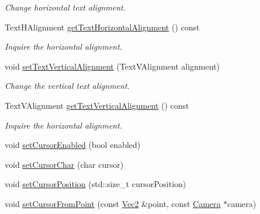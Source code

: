 \begin{DoxyCompactItemize}
\begin{DoxyCompactList}\small\item\em Change horizontal text alignment. \end{DoxyCompactList}\item 
Text\+H\+Alignment \hyperlink{classui_1_1TextField_acd343b03227c7cf58a325f34ba3e1d21}{get\+Text\+Horizontal\+Alignment} () const
\begin{DoxyCompactList}\small\item\em Inquire the horizontal alignment. \end{DoxyCompactList}\item 
void \hyperlink{classui_1_1TextField_a05d3b9f37bbffee99ec903ef59ebca56}{set\+Text\+Vertical\+Alignment} (Text\+V\+Alignment alignment)
\begin{DoxyCompactList}\small\item\em Change the vertical text alignment. \end{DoxyCompactList}\item 
Text\+V\+Alignment \hyperlink{classui_1_1TextField_a79228941a990932f6af8d07268f5a5e7}{get\+Text\+Vertical\+Alignment} () const
\begin{DoxyCompactList}\small\item\em Inquire the horizontal alignment. \end{DoxyCompactList}\item 
void \hyperlink{classui_1_1TextField_acfbd7a912c166c1de933081466976f15}{set\+Cursor\+Enabled} (bool enabled)
\item 
void \hyperlink{classui_1_1TextField_a27149c6499b7651ad4f1fca8211fda1e}{set\+Cursor\+Char} (char cursor)
\item 
void \hyperlink{classui_1_1TextField_a04e48a8fd94ac2015cdaafe73ca62c76}{set\+Cursor\+Position} (std\+::size\+\_\+t cursor\+Position)
\item 
void \hyperlink{classui_1_1TextField_a130ef17d3dda676d98b28e46f1d1f253}{set\+Cursor\+From\+Point} (const \hyperlink{classVec2}{Vec2} \&point, const \hyperlink{classCamera}{Camera} $\ast$camera)
\end{DoxyCompactItemize}
